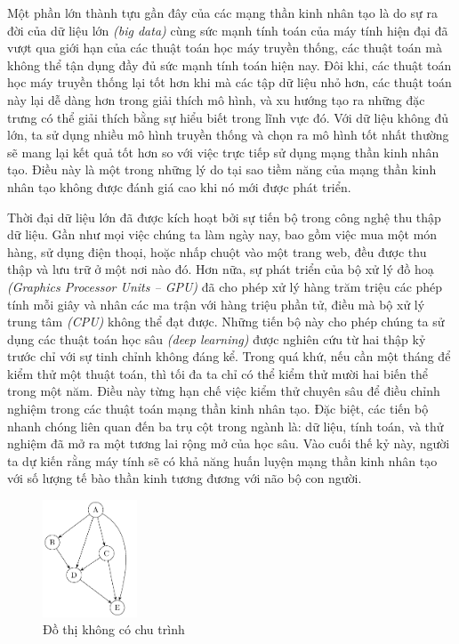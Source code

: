 Một phần lớn thành tựu gần đây của các mạng thần kinh nhân tạo là do sự ra đời của dữ liệu lớn \textit{(big data)} cùng sức mạnh tính toán của máy tính hiện đại đã vượt qua giới hạn của các thuật toán học máy truyền thống, các thuật toán mà không thể tận dụng đầy đủ sức mạnh tính toán hiện nay. Đôi khi, các thuật toán học máy truyền thống lại tốt hơn khi mà các tập dữ liệu nhỏ hơn, các thuật toán này lại dễ dàng hơn trong giải thích mô hình, và xu hướng tạo ra những đặc trưng có thể giải thích bằng sự hiểu biết trong lĩnh vực đó. Với dữ liệu không đủ lớn, ta sử dụng nhiều mô hình truyền thống và chọn ra mô hình tốt nhất thường sẽ mang lại kết quả tốt hơn so với việc trực tiếp sử dụng mạng thần kinh nhân tạo. Điều này là một trong những lý do tại sao tiềm năng của mạng thần kinh nhân tạo không được đánh giá cao khi nó mới được phát triển.

Thời đại dữ liệu lớn đã được kích hoạt bởi sự tiến bộ trong công nghệ thu thập dữ liệu. Gần như mọi việc chúng ta làm ngày nay, bao gồm việc mua một món hàng, sử dụng điện thoại, hoặc nhấp chuột vào một trang web, đều được thu thập và lưu trữ ở một nơi nào đó. Hơn nữa, sự phát triển của bộ xử lý đồ hoạ \textit{(Graphics Processor Units – GPU)} đã cho phép xử lý hàng trăm triệu các phép tính mỗi giây và nhân các ma trận với hàng triệu phần tử, điều mà bộ xử lý trung tâm \textit{(CPU)} không thể đạt được. Những tiến bộ này cho phép chúng ta sử dụng các thuật toán học sâu \textit{(deep learning)} được nghiên cứu từ hai thập kỷ trước chỉ với sự tinh chỉnh không đáng kể. Trong quá khứ, nếu cần một tháng để kiểm thử một thuật toán, thì tối đa ta chỉ có thể kiểm thử mười hai biến thể trong một năm. Điều này từng hạn chế việc kiểm thử chuyên sâu để điều chỉnh nghiệm trong các thuật toán mạng thần kinh nhân tạo. Đặc biệt, các tiến bộ nhanh chóng liên quan đến ba trụ cột trong ngành là: dữ liệu, tính toán, và thử nghiệm đã mở ra một tương lai rộng mở của học sâu. Vào cuối thế kỷ này, người ta dự kiến rằng máy tính sẽ có khả năng huấn luyện mạng thần kinh nhân tạo với số lượng tế bào thần kinh tương đương với não bộ con người.\cite{Aggarwal2023-zk}
\begin{figure}[htb]
    \centering
    \includegraphics[width=0.25\textwidth]{tikz_image/directed_acyclic_graph.pdf}
    \caption{Đồ thị không có chu trình}
    \label{figure:directed-acyclic-graph}
\end{figure}

